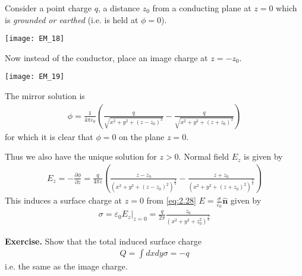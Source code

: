 \documentclass[a4paper]{article}
\begin{document}
\begin{eg}
Consider a point charge $q$, a distance $z_0$ from a conducting plane at $z=0$ which is \emph{grounded or earthed} (i.e. is held at $\phi=0$).

\texttt{[image: EM\_18]}

Now instead of the conductor, place an image charge at $z=-z_0$.

\texttt{[image: EM\_19]}

The mirror solution is
\begin{equation*} 
\begin{aligned}
\phi = \frac{1}{4\pi \varepsilon_0} \left(\frac{q}{\sqrt{x^2+y^2 + (z-z_0)^2}}- \frac{q}{\sqrt{x^2 + y^2 + (z+z_0)^2}}\right)
\end{aligned}
\end{equation*}
for which it is clear that $\phi=0$ on the plane $z=0$.

Thus we also have the unique solution for $z>0$. Normal field $E_z$ is given by
\begin{equation*}\tag{2.29} \label{eq:2.29}
\begin{aligned}
E_z = -\frac{\partial \phi}{\partial z} = \frac{q}{4\pi \varepsilon} \left(\frac{z-z_0}{(x^2+y^2+(z-z_0)^2)^\frac{3}{2}} - \frac{z+z_0}{(x^2+y^2+(z+z_0)^2)^\frac{3}{2}} \right)
\end{aligned}
\end{equation*}
This induces a surface charge at $z=0$ from \eqref{eq:2.28} $E=\frac{\sigma}{\varepsilon_0} \hat{\mathbf{n}}$ given by
\begin{equation*}\tag{2.31} \label{eq:2.31}
\begin{aligned}
\sigma = \varepsilon_0 E_z|_{z=0} = \frac{q}{2\pi} \frac{z_0}{(x^2+y^2+z_0^2)^\frac{3}{2}}
\end{aligned}
\end{equation*}
\end{eg}

\textbf{Exercise.} Show that the total induced surface charge
\begin{equation*}
\begin{aligned}
Q=\int dxdy\sigma = -q
\end{aligned}
\end{equation*}
i.e. the same as the image charge.
\end{document}
